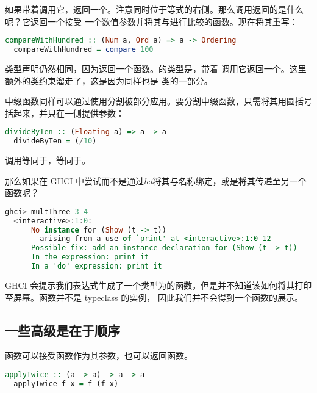 \documentclass[./main.tex]{subfiles}
\begin{document}
如果带着调用它，返回一个。注意同时位于等式的右侧。那么调用返回的是什么呢？它返回一个接受
一个数值参数并将其与进行比较的函数。现在将其重写：

\begin{lstlisting}[language=Haskell]
  compareWithHundred :: (Num a, Ord a) => a -> Ordering
  compareWithHundred = compare 100
\end{lstlisting}

类型声明仍然相同，因为返回一个函数。的类型是，带着
调用它返回一个。这里额外的类约束溜走了，这是因为同样也是
类的一部分。

中缀函数同样可以通过使用分割被部分应用。要分割中缀函数，只需将其用圆括号括起来，并只在一侧提供参数：

\begin{lstlisting}[language=Haskell]
  divideByTen :: (Floating a) => a -> a
  divideByTen = (/10)
\end{lstlisting}

调用等同于，等同于。

那么如果在 GHCI 中尝试而不是通过\textit{let}将其与名称绑定，或是将其传递至另一个函数呢？

\begin{lstlisting}[language=Haskell]
  ghci> multThree 3 4
  <interactive>:1:0:
      No instance for (Show (t -> t))
        arising from a use of `print' at <interactive>:1:0-12
      Possible fix: add an instance declaration for (Show (t -> t))
      In the expression: print it
      In a 'do' expression: print it
\end{lstlisting}

GHCI 会提示我们表达式生成了一个类型为的函数，但是并不知道该如何将其打印至屏幕。函数并不是 typeclass 的实例，
因此我们并不会得到一个函数的展示。

\subsection*{一些高级是在于顺序}

函数可以接受函数作为其参数，也可以返回函数。

\begin{lstlisting}[language=Haskell]
  applyTwice :: (a -> a) -> a -> a
  applyTwice f x = f (f x)
\end{lstlisting}
\end{document}
